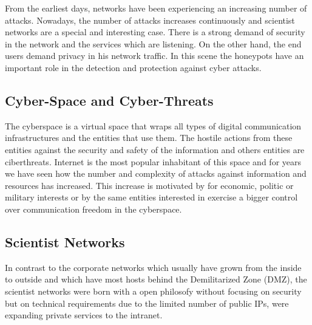 \documentclass[a4paper]{llncs}
\begin{document}
From the earliest days, %
  networks have been experiencing an increasing number of
  attacks. Nowadays, %
 the number of attacks increases continuously and scientist networks
 are a special and interesting case. %
 There is a strong demand of security in the network and the services which are listening. On the other hand, the end users demand privacy in his network traffic. In this scene the honeypots have an important role in the detection and protection against cyber attacks.

\subsection{Cyber-Space and Cyber-Threats}
\label{sect:Scientist Networks}

The cyberspace is a virtual space that wraps all types of digital
communication  infrastructures and the entities that use them. The
hostile actions from these entities against the security and safety of
the information and others entities are ciberthreats. Internet is the
most popular inhabitant of this space and for years we have seen how
the number and complexity of attacks against information and resources
has increased. This increase is motivated by for economic, politic or
military interests or by the same entities interested in exercise a
bigger control over communication freedom in the cyberspace.  %


\subsection{Scientist Networks}
\label{sect:Scientist Networks}
In contrast to the corporate networks which usually have grown from
the inside to outside %
and which have most hosts behind the Demilitarized
 Zone (DMZ), %
the scientist networks were born with a open philosofy
 without focusing on security but on technical requirements due to
the limited number of public IPs, were expanding private services to
the intranet.
\end{document}
